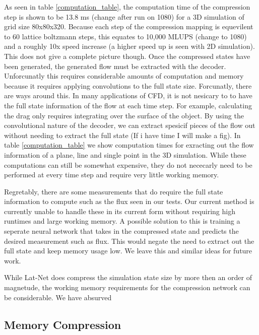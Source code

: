 \documentclass{article}
\begin{document}
As seen in table \ref{computation_table}, the computation time of the compression step is shown to be 13.8 ms (change after run on 1080) for a 3D simulation of grid size 80x80x320. Because each step of the compression mapping is equevilent to 60 lattice boltzmann steps, this equates to 10,000 MLUPS (change to 1080) and a roughly 10x speed increase (a higher speed up is seen with 2D simulation). This does not give a complete picture though. Once the compressed states have been generated, the generated flow must be extracted with the decoder. Unforcunatly this requires considerable amounts of computation and memory because it requires applying convolutions to the full state size. Forcunatly, there are ways around this. In many applications of CFD, it is not nesicary to to have the full state information of the flow at each time step. For example, calculating the drag only requires integrating over the surface of the object. By using the convolutional nature of the decoder, we can extract spesicif pieces of the flow out without needing to extract the full state (If i have time I will make a fig). In table \ref{computation_table} we show computation times for exracting out the flow information of a plane, line and single point in the 3D simulation. While these computations can still be somewhat expensive, they do not nececarly need to be performed at every time step and require very little working memory. 

Regretably, there are some measurements that do require the full state information to compute such as the flux seen in our tests. Our current method is currently unable to handle these in its current form without requiring high runtimes and large working memory. A possible solution to this is training a seperate neural network that takes in the compressed state and predicts the desired measurement such as flux. This would negate the need to extract out the full state and keep memory usage low. We leave this and similar ideas for future work.

While Lat-Net does compress the simulation state size by more then an order of magnetude, the working memory requirements for the compression network can be considerable. We have absurved

\subsection{Memory Compression}
\end{document}
